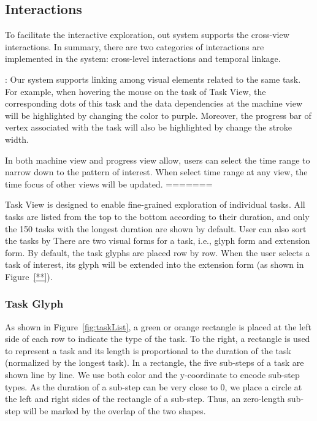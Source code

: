 \subsection{Interactions}
To facilitate the interactive exploration, out system supports the cross-view interactions. 
In summary, there are two categories of interactions are implemented in the system: cross-level interactions and temporal linkage.

:
Our system supports linking among visual elements related to the same task. 
For example, when hovering the mouse on the task of Task View, the corresponding dots of this task and the data dependencies at the machine view will be highlighted by changing the color to purple. Moreover, the progress bar of vertex associated with the task will also be highlighted by change the stroke width.   

In both machine view and progress view allow, users can select the time range to narrow down to the pattern of interest. When select time range at any view, the time focus of other views will be updated. 
=======

Task View is designed to enable fine-grained exploration of individual tasks.
All tasks are listed from the top to the bottom according to their duration, and only the 150 tasks with the longest duration are shown by default. User can also sort the tasks by There are two visual forms for a task, i.e., glyph form and extension form. By default, the task glyphs are placed row by row. When the user selects a task of interest, its glyph will be extended into the extension form (as shown in Figure~\ref{**}).


\subsubsection{Task Glyph}
As shown in Figure~\ref{fig:taskList}, a green or orange rectangle is placed at the left side of each row to indicate the type of the task. To the right, a rectangle is used to represent a task and its length is proportional to the duration of the task (normalized by the longest task). In a rectangle, the five sub-steps of a task are shown line by line. We use both color and the y-coordinate to encode sub-step types. As the duration of a sub-step can be very close to 0, we place a circle at the left and right sides of the rectangle of a sub-step. Thus, an zero-length sub-step will be marked by the overlap of the two shapes.

